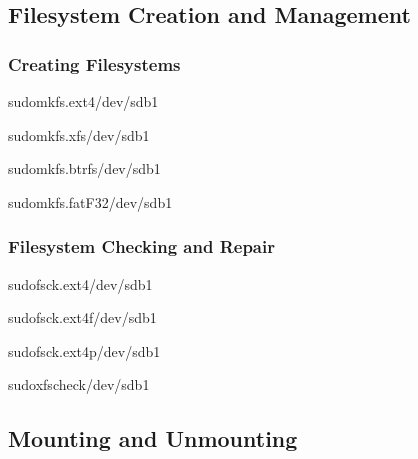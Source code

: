 \documentclass[letterpaper,10pt,english]{sphinxmanual}
\begin{document}
\subsection{Filesystem Creation and Management}
\label{\detokenize{disk-management:filesystem-creation-and-management}}

\subsubsection{Creating Filesystems}
\label{\detokenize{disk-management:creating-filesystems}}
\begin{sphinxVerbatim}[commandchars=\\\{\}]
sudomkfs.ext4/dev/sdb1

sudomkfs.xfs/dev/sdb1

sudomkfs.btrfs/dev/sdb1

sudomkfs.fat\PYGZhy{}F32/dev/sdb1
\end{sphinxVerbatim}


\subsubsection{Filesystem Checking and Repair}
\label{\detokenize{disk-management:filesystem-checking-and-repair}}
\begin{sphinxVerbatim}[commandchars=\\\{\}]
sudofsck.ext4/dev/sdb1

sudofsck.ext4\PYGZhy{}f/dev/sdb1

sudofsck.ext4\PYGZhy{}p/dev/sdb1

sudoxfs\PYGZus{}check/dev/sdb1
\end{sphinxVerbatim}


\subsection{Mounting and Unmounting}
\label{\detokenize{disk-management:mounting-and-unmounting}}
\end{document}
